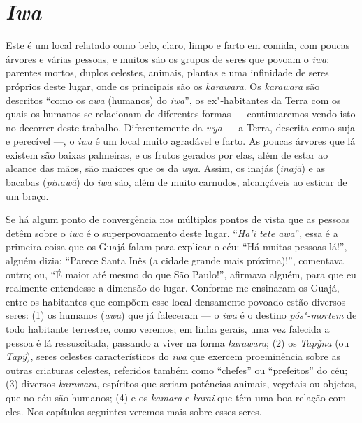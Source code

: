 \section{\emph{Iwa}}\label{iwa}

Este é um local relatado como belo, claro, limpo e farto em comida, com
poucas árvores e várias pessoas, e muitos são os grupos de seres que
povoam o \emph{iwa}: parentes mortos, duplos celestes, animais, plantas
e uma infinidade de seres próprios deste lugar, onde os principais são
os \emph{karawara}. Os \emph{karawara} são descritos ``como os \emph{awa}
(humanos) do \emph{iwa}'', os ex"-habitantes da Terra com os quais os
humanos se relacionam de diferentes formas --- continuaremos vendo isto no
decorrer deste trabalho. Diferentemente da \emph{wya} --- a Terra,
descrita como suja e perecível ---, o \emph{iwa} é um local muito
agradável e farto. As poucas árvores que lá existem são baixas
palmeiras, e os frutos gerados por elas, além de estar ao alcance das
mãos, são maiores que os da \emph{wya}. Assim, os inajás (\emph{inajã})
e as bacabas (\emph{pinawã}) do \emph{iwa} são, além de muito carnudos,
alcançáveis ao esticar de um braço.

Se há algum ponto de convergência nos múltiplos pontos de vista que as
pessoas detêm sobre o \emph{iwa} é o superpovoamento deste lugar.
``\emph{Ha'i tete awa}'', essa é a primeira coisa que os Guajá falam para
explicar o céu: ``Há muitas pessoas lá!'', alguém dizia; ``Parece Santa
Inês (a cidade grande mais próxima)!'', comentava outro; ou, ``É maior até
mesmo do que São Paulo!'', afirmava alguém, para que eu realmente
entendesse a dimensão do lugar. Conforme me ensinaram os Guajá, entre os
habitantes que compõem esse local densamente povoado estão diversos
seres: (1) os humanos (\emph{awa}) que já faleceram --- o \emph{iwa} é o
destino \emph{pós"-mortem} de todo habitante terrestre, como veremos; em
linha gerais, uma vez falecida a pessoa é lá ressuscitada, passando a
viver na forma \emph{karawara}; (2) os \emph{Tapỹna} (ou \emph{Tapỹ}),
seres celestes característicos do \emph{iwa} que exercem proeminência
sobre as outras criaturas celestes, referidos também como ``chefes'' ou
``prefeitos'' do céu; (3) diversos \emph{karawara}, espíritos que seriam
potências animais, vegetais ou objetos, que no céu são humanos; (4) e os
\emph{kamara} e \emph{karai} que têm uma boa relação com eles. Nos
capítulos seguintes veremos mais sobre esses seres.

